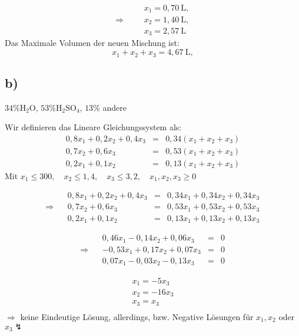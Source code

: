 \[
\Rightarrow \quad
\begin{aligned}
    &x_1 = 0,70 \ \text{L}, \\
    &x_2 = 1,40 \ \text{L}, \\
    &x_3 = 2,57 \ \text{L}
\end{aligned}
\]
Das Maximale Volumen der neuen Mischung ist:
\[
x_1 + x_2 + x_3 = 4,67 \ \text{L},
\]

\subsection{b)}
\( 34\% \text{H}_2\text{O} \), \( 53\% \text{H}_2\text{SO}_4 \), \( 13\% \) andere

Wir definieren das Lineare Gleichungssystem als: 
\[
\begin{aligned}
    0,8x_1 + 0,2x_2 + 0,4x_3 & = & 0,34(x_1 + x_2 + x_3) \\
    0,7x_2 + 0,6x_3 & = & 0,53(x_1 + x_2 + x_3) \\
    0,2x_1 + 0,1x_2 & = & 0,13(x_1 + x_2 + x_3)
\end{aligned}
\]
Mit $x_1 \leq 300, \quad x_2 \leq 1,4, \quad x_3 \leq 3,2, \quad x_1, x_2, x_3 \geq 0$

$$
\Rightarrow \quad
\begin{aligned}
    0,8x_1 + 0,2x_2 + 0,4x_3 & = & 0,34x_1 + 0,34x_2 + 0,34x_3 \\
    0,7x_2 + 0,6x_3 & = & 0,53x_1 + 0,53x_2 + 0,53x_3 \\
    0,2x_1 + 0,1x_2 & = & 0,13x_1 + 0,13x_2 + 0,13x_3 
\end{aligned}
$$

$$
\Rightarrow \quad
\begin{aligned}
    0,46x_1-0,14x_2+0,06x_3 & = & 0 \\
    -0,53x_1 + 0,17x_2 + 0,07x_3 & = & 0\\
    0,07x_1 -0,03x_2 - 0,13x_3 & = & 0
\end{aligned}
$$

$$
\begin{aligned}
    x_1=-5x_3 \\
    x_2=-16x_3 \\
    x_3=x_3 \\
\end{aligned}
$$
$\Rightarrow$ keine Eindeutige Lösung, allerdings, bzw. Negative Lösungen für $x_1, x_2 $ oder $x_3 \lightning$